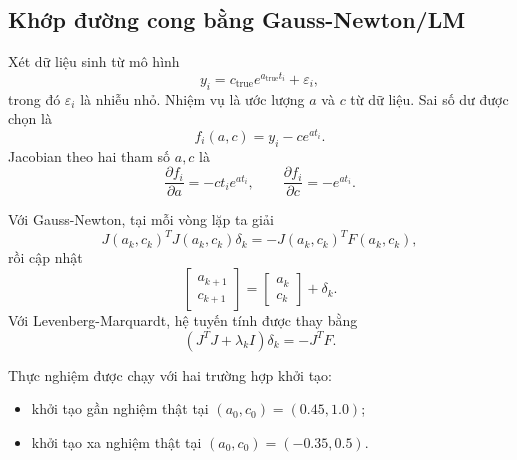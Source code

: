 \subsection{Khớp đường cong bằng Gauss-Newton/LM}
\label{SUB_SEC_exp_gn_lm}
Xét dữ liệu sinh từ mô hình
\begin{equation}
    y_i=c_{\mathrm{true}}e^{a_{\mathrm{true}}t_i}+\varepsilon_i,
    \label{eq_exp_data_generation}
\end{equation}
trong đó $\varepsilon_i$ là nhiễu nhỏ. Nhiệm vụ là ước lượng $a$ và $c$ từ dữ liệu. Sai số dư được chọn là
\begin{equation}
    f_i(a,c)=y_i-ce^{at_i}.
    \label{eq_exp_residual_experiment}
\end{equation}
Jacobian theo hai tham số $a,c$ là
\begin{equation}
    \frac{\partial f_i}{\partial a}
    =
    -ct_i e^{at_i},
    \qquad
    \frac{\partial f_i}{\partial c}
    =
    -e^{at_i}.
    \label{eq_exp_jacobian}
\end{equation}
\medskip

Với Gauss-Newton, tại mỗi vòng lặp ta giải
\begin{equation}
    J(a_k,c_k)^{T}J(a_k,c_k)\delta_k
    =
    -J(a_k,c_k)^{T}F(a_k,c_k),
    \label{eq_exp_gn_system}
\end{equation}
rồi cập nhật
\begin{equation}
    \begin{bmatrix}
        a_{k+1}\\
        c_{k+1}
    \end{bmatrix}
    =
    \begin{bmatrix}
        a_k\\
        c_k
    \end{bmatrix}
    +\delta_k.
    \label{eq_exp_gn_update}
\end{equation}
Với Levenberg-Marquardt, hệ tuyến tính được thay bằng
\begin{equation}
    \left(J^{T}J+\lambda_k I\right)\delta_k
    =
    -J^{T}F.
    \label{eq_exp_lm_system}
\end{equation}
\medskip

Thực nghiệm được chạy với hai trường hợp khởi tạo:
\begin{itemize}
    \item khởi tạo gần nghiệm thật tại $(a_0,c_0)=(0.45,1.0)$;
    \item khởi tạo xa nghiệm thật tại $(a_0,c_0)=(-0.35,0.5)$.
\end{itemize}

